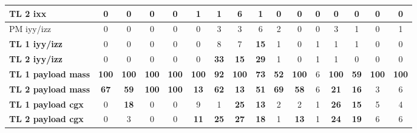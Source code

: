 \begin{table}[H]
\begin{tabular}{|l|c|c|c|c|c|c|c|c|c|c|c|c|c|c|c|}
\hline
TL 2 \gls{ixx} & 0 & 0 & 0 & 0 & 1 & 1 & 6 & 1 & 0 & 0 & 0 & 0 & 0 & 0 & 0 \\
\hline
PM \gls{iyy}/\gls{izz} & 0 & 0 & 0 & 0 & 0 & 3 & 3 & 6 & 2 & 0 & 0 & 3 & 1 & 0 & 1 \\
\hline
\textbf{TL 1 \gls{iyy}/\gls{izz}} & 0 & 0 & 0 & 0 & 0 & 8 & 7 & \textbf{15} & 1 & 0 & 1 & 1 & 1 & 0 & 0 \\
\hline
\textcolor[rgb]{0.000, 0.620, 0.451}{\textbf{TL 2 \gls{iyy}/\gls{izz}}} & 0 & 0 & 0 & 0 & 0 & \textcolor[rgb]{0.000, 0.620, 0.451}{\textbf{33}} & \textbf{15} & \textcolor[rgb]{0.000, 0.620, 0.451}{\textbf{29}} & 1 & 0 & 1 & 1 & 0 & 0 & 0 \\
\hline
\textcolor[rgb]{0.851, 0.373, 0.008}{\textbf{TL 1 payload mass}} & \textcolor[rgb]{0.835, 0.369, 0.000}{\textbf{100}} & \textcolor[rgb]{0.835, 0.369, 0.000}{\textbf{100}} & \textcolor[rgb]{0.835, 0.369, 0.000}{\textbf{100}} & \textcolor[rgb]{0.835, 0.369, 0.000}{\textbf{100}} & \textcolor[rgb]{0.835, 0.369, 0.000}{\textbf{100}} & \textcolor[rgb]{0.000, 0.447, 0.698}{\textbf{92}} & \textcolor[rgb]{0.835, 0.369, 0.000}{\textbf{100}} & \textcolor[rgb]{0.000, 0.447, 0.698}{\textbf{73}} & \textcolor[rgb]{0.000, 0.447, 0.698}{\textbf{52}} & \textcolor[rgb]{0.835, 0.369, 0.000}{\textbf{100}} & 6 & \textcolor[rgb]{0.835, 0.369, 0.000}{\textbf{100}} & \textcolor[rgb]{0.000, 0.447, 0.698}{\textbf{59}} & \textcolor[rgb]{0.835, 0.369, 0.000}{\textbf{100}} & \textcolor[rgb]{0.835, 0.369, 0.000}{\textbf{100}} \\
\hline
\textcolor[rgb]{0.851, 0.373, 0.008}{\textbf{TL 2 payload mass}} & \textcolor[rgb]{0.000, 0.447, 0.698}{\textbf{67}} & \textcolor[rgb]{0.000, 0.447, 0.698}{\textbf{59}} & \textcolor[rgb]{0.835, 0.369, 0.000}{\textbf{100}} & \textcolor[rgb]{0.835, 0.369, 0.000}{\textbf{100}} & \textbf{13} & \textcolor[rgb]{0.000, 0.447, 0.698}{\textbf{62}} & \textbf{13} & \textcolor[rgb]{0.000, 0.447, 0.698}{\textbf{51}} & \textcolor[rgb]{0.000, 0.447, 0.698}{\textbf{69}} & \textcolor[rgb]{0.000, 0.447, 0.698}{\textbf{58}} & 6 & \textbf{21} & \textbf{16} & 3 & 6 \\
\hline
\textcolor[rgb]{0.000, 0.620, 0.451}{\textbf{TL 1 payload \gls{cgx}}} & 0 & \textbf{18} & 0 & 0 & 9 & 1 & \textcolor[rgb]{0.000, 0.620, 0.451}{\textbf{25}} & \textbf{13} & 2 & 2 & 1 & \textcolor[rgb]{0.000, 0.620, 0.451}{\textbf{26}} & \textbf{15} & 5 & 4 \\
\hline
\textcolor[rgb]{0.000, 0.620, 0.451}{\textbf{TL 2 payload \gls{cgx}}} & 0 & 3 & 0 & 0 & \textbf{11} & \textcolor[rgb]{0.000, 0.620, 0.451}{\textbf{25}} & \textcolor[rgb]{0.000, 0.620, 0.451}{\textbf{27}} & \textbf{18} & 1 & \textbf{13} & 1 & \textbf{24} & \textbf{19} & 6 & 6 \\

\end{tabular}
\end{table}
